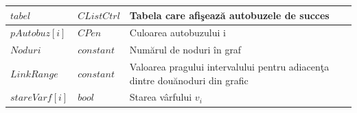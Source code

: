 \documentclass[11pt,a4paper]{report}
\begin{document}
\begin{center}
\begin{tabular}{ |p{3.1cm}|p{2cm}|p{6.1cm}|  }
     		\hline
     		$tabel$          & $CListCtrl$ & Tabela care afi\c seaz\u a autobuzele de succes\vspace{0.1cm}\\
     		\hline
     		$pAutobuz[i]$        & $CPen$      & Culoarea autobuzului i\vspace{0.1cm}\\
     		\hline
     		$Noduri$              & $constant$  & Num\u arul de noduri \^ in graf\vspace{0.1cm}\\
     		\hline
     		$LinkRange$      & $constant$  & Valoarea pragului intervalului pentru adiacen\c ta dintre dou\u anoduri din grafic\vspace{0.1cm}\\
     		\hline
     		$stareVarf[i]$          & $bool$      & Starea v\^ arfului $v_{i}$\vspace{0.1cm}\\
     		
     		\hline
     	\end{tabular}
     	
     \end{center}

     \newpage
\end{document}
